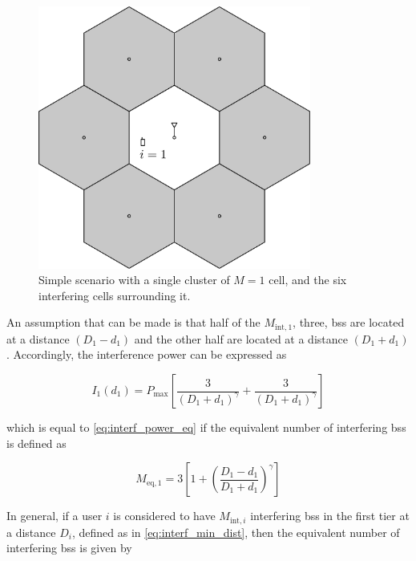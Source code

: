 \begin{figure}[t]
\begin{center}
    \includegraphics[width=0.8\textwidth]{./10.achievable_rates/img/cluster_1}
\end{center}
\caption{Simple scenario with a single cluster of $M = 1$ cell, and the six
    interfering cells surrounding it.}
\label{fig:cluster_1}
\end{figure}

An assumption that can be made is that half of the $M_{\text{int}, 1}$, \ie three, \glspl{bs} are located at a distance $\left( D_1 - d_1 \right)$ and the
other half are located at a distance $\left( D_1 + d_1 \right)$. Accordingly,
the interference power can be expressed as

\begin{equation} \label{eq:interf_cluster_1}
    I_1\left(d_1\right) = P_{\max} \left[ \frac{3}{\left(D_1 + d_1
        \right)^\gamma} + \frac{3}{\left(D_1 + d_1 \right)^\gamma}\right]
\end{equation}

\noindent
which is equal to \eqref{eq:interf_power_eq} if the equivalent number of
interfering \glspl{bs} is defined as

\begin{equation} \label{eq:meq_cluster_1}
    M_{\text{eq},1} = 3 \left[ 1 + \left(\frac{D_1 - d_1}{D_1 + d_1}
    \right)^\gamma\right]
\end{equation}

In general, if a user $i$ is considered to have $M_{\text{int}, i}$ interfering
\glspl{bs} in the first tier at a distance $D_i$, defined as in
\eqref{eq:interf_min_dist}, then the equivalent number of interfering \glspl{bs}
is given by

